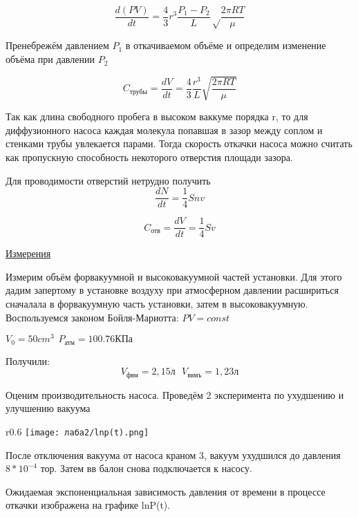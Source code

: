 \documentclass[a4paper]{article}
\begin{document}
\[\frac{d(PV)}{dt} = \frac{4}{3}r^3\frac{P_1 - P_2}{L}\sqrt\frac{2\pi{RT}}{\mu}\]

Пренебрежём давлением $P_1$ в откачиваемом объёме и определим изменение объёма при давлении $P_2$

\[C_{\text{трубы}} = \frac{dV}{dt} = \frac{4}{3}\frac{r^3}{L}\sqrt{\frac{2\pi{RT}}{\mu}}\]

Так как длина свободного пробега в высоком ваккуме порядка r, то для диффузионного насоса
каждая молекула попавшая в зазор между соплом и стенками трубы увлекается парами.
Тогда скорость откачки насоса можно считать как пропускную способность некоторого отверстия площади зазора.

Для проводимости отверстий нетрудно получить 
\[\frac{dN}{dt} = \frac{1}{4}Snv\]

\[C_{\text{отв}} = \frac{dV}{dt} = \frac{1}{4}Sv\]

\pagebreak

\underline{Измерения} \vspace{2pt}

Измерим объём форвакуумной и высоковакуумной частей установки. Для этого дадим запертому в установке воздуху
при атмосферном давлении расшириться сначалала в форвакуумную часть установки, затем в высоковакуумную. 
Воспользуемся законом Бойля-Мариотта: $PV = const$

$V_0 = 50 cm^3 \hspace{5pt}P_{\text{атм}} = 100.76 \text{КПа} $

Получили:
\[V_{\text{фвм}} = 2,15 \text{л} \hspace{8pt}  V_{\text{ввмъ}} = 1,23 \text{л}\]
\vspace{5pt}

Оценим производительность насоса. Проведём 2 эксперимента по ухудшению и улучшению вакуума

\begin{wrapfigure}{r}{0.6\textwidth}
    \centering
    \texttt{[image: лаба2/lnp(t).png]}
    \caption{$ln(\frac{P}{P_0});\hspace{5pt} t, c$}
\end{wrapfigure}
\vspace{7pt}

После отключения вакуума от насоса краном 3, вакуум ухудшился до давления $8 * 10^{-4}$ тор.
Затем вв балон снова подключается к насосу.

Ожидаемая экспоненциальная зависимость давления от времени
в процессе откачки изображена на графике lnP(t).
\end{document}
